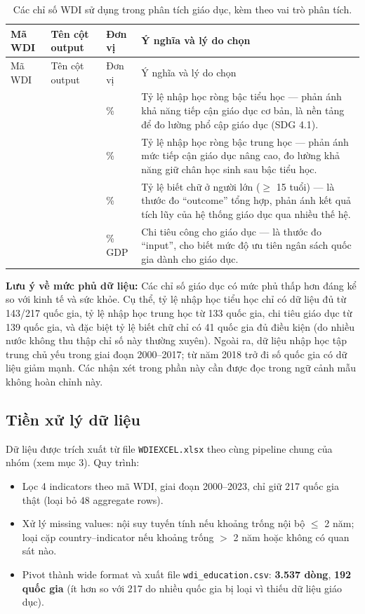 \begin{longtable}{L{3.8cm}L{3.5cm}L{1.3cm}L{5cm}}
\caption{Các chỉ số WDI sử dụng trong phân tích giáo dục, kèm theo vai trò phân tích.}
\label{tab:education-indicators}\\
\toprule
Mã WDI & Tên cột output & Đơn vị & Ý nghĩa và lý do chọn \\
\midrule
\endfirsthead
\toprule
Mã WDI & Tên cột output & Đơn vị & Ý nghĩa và lý do chọn \\
\midrule
\endhead
{} &  & \% & Tỷ lệ nhập học ròng bậc tiểu học --- phản ánh khả năng tiếp cận giáo dục cơ bản, là nền tảng để đo lường phổ cập giáo dục (SDG 4.1). \\
 &  & \% & Tỷ lệ nhập học ròng bậc trung học --- phản ánh mức tiếp cận giáo dục nâng cao, đo lường khả năng giữ chân học sinh sau bậc tiểu học. \\
 &  & \% & Tỷ lệ biết chữ ở người lớn ($\geq$ 15 tuổi) --- là thước đo ``outcome'' tổng hợp, phản ánh kết quả tích lũy của hệ thống giáo dục qua nhiều thế hệ. \\
 &  & \% GDP & Chi tiêu công cho giáo dục --- là thước đo ``input'', cho biết mức độ ưu tiên ngân sách quốc gia dành cho giáo dục. \\
\bottomrule
\end{longtable}

\textbf{Lưu ý về mức phủ dữ liệu:} Các chỉ số giáo dục có mức phủ thấp hơn đáng kể so với kinh tế và sức khỏe. Cụ thể, tỷ lệ nhập học tiểu học chỉ có dữ liệu đủ từ 143/217 quốc gia, tỷ lệ nhập học trung học từ 133 quốc gia, chi tiêu giáo dục từ 139 quốc gia, và đặc biệt tỷ lệ biết chữ chỉ có 41 quốc gia đủ điều kiện (do nhiều nước không thu thập chỉ số này thường xuyên). Ngoài ra, dữ liệu nhập học tập trung chủ yếu trong giai đoạn 2000--2017; từ năm 2018 trở đi số quốc gia có dữ liệu giảm mạnh. Các nhận xét trong phần này cần được đọc trong ngữ cảnh mẫu không hoàn chỉnh này.

\subsection{Tiền xử lý dữ liệu}

Dữ liệu được trích xuất từ file \texttt{WDIEXCEL.xlsx} theo cùng pipeline chung của nhóm (xem mục 3). Quy trình:

\begin{itemize}
    \item Lọc 4 indicators theo mã WDI, giai đoạn 2000--2023, chỉ giữ 217 quốc gia thật (loại bỏ 48 aggregate rows).
    \item Xử lý missing values: nội suy tuyến tính nếu khoảng trống nội bộ $\leq$ 2 năm; loại cặp country--indicator nếu khoảng trống $>$ 2 năm hoặc không có quan sát nào.
    \item Pivot thành wide format và xuất file \texttt{wdi\_education.csv}: \textbf{3.537 dòng}, \textbf{192 quốc gia} (ít hơn so với 217 do nhiều quốc gia bị loại vì thiếu dữ liệu giáo dục).
\end{itemize}

